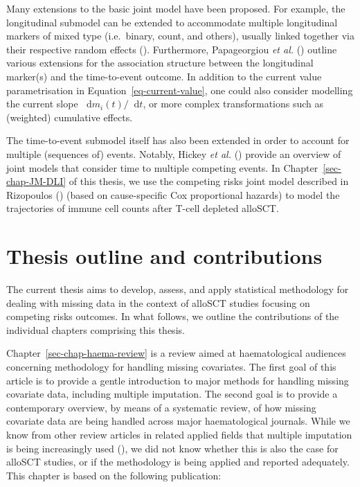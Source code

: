 \documentclass[
  letterpaper,
  paper=240mm:170mm,
  twoside=true,
  open=right,
  fontsize=10pt,
  pagesize=false,
  BCOR=15mm,
  DIV=14,
  headinclude=true,
  footinclude=false,
  headsepline=on]{scrbook}
\newcommand\diff{\mathop{}\!\mathrm{d}}
\begin{document}
Many extensions to the basic joint model have been proposed. For
example, the longitudinal submodel can be extended to accommodate
multiple longitudinal markers of mixed type (i.e.~binary, count, and
others), usually linked together via their respective random effects
(). Furthermore, Papageorgiou \emph{et al.}
() outline
various extensions for the association structure between the
longitudinal marker(s) and the time-to-event outcome. In addition to the
current value parametrisation in Equation~\ref{eq-current-value}, one
could also consider modelling the current slope
\(\diff m_i(t) / \diff t\), or more complex transformations such as
(weighted) cumulative effects.

The time-to-event submodel itself has also been extended in order to
account for multiple (sequences of) events. Notably, Hickey \emph{et
al.} () provide an
overview of joint models that consider time to multiple competing
events. In Chapter~\ref{sec-chap-JM-DLI} of this thesis, we use the
competing risks joint model described in Rizopoulos
() (based on
cause-specific Cox proportional hazards) to model the trajectories of
immune cell counts after T-cell depleted alloSCT.

\section{Thesis outline and contributions}\label{sec-intro-outline}

The current thesis aims to develop, assess, and apply statistical
methodology for dealing with missing data in the context of alloSCT
studies focusing on competing risks outcomes. In what follows, we
outline the contributions of the individual chapters comprising this
thesis.

Chapter~\ref{sec-chap-haema-review} is a review aimed at haematological
audiences concerning methodology for handling missing covariates. The
first goal of this article is to provide a gentle introduction to major
methods for handling missing covariate data, including multiple
imputation. The second goal is to provide a contemporary overview, by
means of a systematic review, of how missing covariate data are being
handled across major haematological journals. While we know from other
review articles in related applied fields that multiple imputation is
being increasingly used
(), we did not know whether this is also the case for
alloSCT studies, or if the methodology is being applied and reported
adequately. This chapter is based on the following publication:
\end{document}
